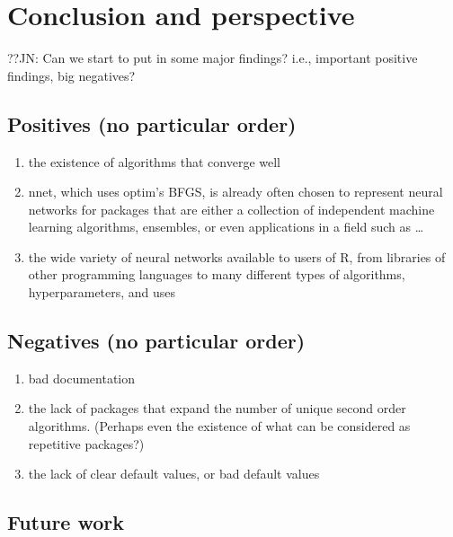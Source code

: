 \hypertarget{conclusion-and-perspective}{%
\section{Conclusion and perspective}\label{conclusion-and-perspective}}

??JN: Can we start to put in some major findings? i.e., important
positive findings, big negatives?

\hypertarget{positives-no-particular-order}{%
\subsection{Positives (no particular
order)}\label{positives-no-particular-order}}

\begin{enumerate}
\def\labelenumi{\arabic{enumi}.}
\tightlist
\item
  the existence of algorithms that converge well
\item
  nnet, which uses optim's BFGS, is already often chosen to represent
  neural networks for packages that are either a collection of
  independent machine learning algorithms, ensembles, or even
  applications in a field such as \ldots{}
\item
  the wide variety of neural networks available to users of R, from
  libraries of other programming languages to many different types of
  algorithms, hyperparameters, and uses
\end{enumerate}

\hypertarget{negatives-no-particular-order}{%
\subsection{Negatives (no particular
order)}\label{negatives-no-particular-order}}

\begin{enumerate}
\def\labelenumi{\arabic{enumi}.}
\tightlist
\item
  bad documentation
\item
  the lack of packages that expand the number of unique second order
  algorithms. (Perhaps even the existence of what can be considered as
  repetitive packages?)
\item
  the lack of clear default values, or bad default values
\end{enumerate}

\hypertarget{future-work}{%
\subsection{Future work}\label{future-work}}


